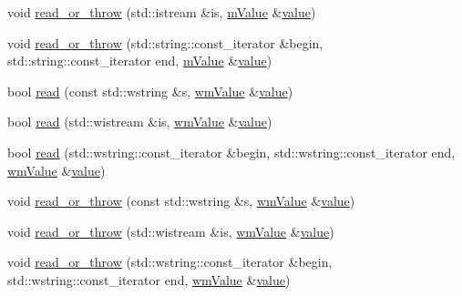 \begin{DoxyCompactItemize}
\item 
void \hyperlink{namespacejson__spirit_ab89d300348df2281cd5f021f19cd02a0}{read\+\_\+or\+\_\+throw} (std\+::istream \&is, \hyperlink{namespacejson__spirit_a4dfd55710919c7c5e20fcbe4e4fe7b46}{m\+Value} \&\hyperlink{cache_8cc_a0f61d63b009d0880a89c843bd50d8d76}{value})
\item 
void \hyperlink{namespacejson__spirit_a965fb92985785a8c65837a106f914834}{read\+\_\+or\+\_\+throw} (std\+::string\+::const\+\_\+iterator \&begin, std\+::string\+::const\+\_\+iterator end, \hyperlink{namespacejson__spirit_a4dfd55710919c7c5e20fcbe4e4fe7b46}{m\+Value} \&\hyperlink{cache_8cc_a0f61d63b009d0880a89c843bd50d8d76}{value})
\item 
bool \hyperlink{namespacejson__spirit_a40037a316f72030c69378d353352b74a}{read} (const std\+::wstring \&s, \hyperlink{namespacejson__spirit_a2b6befe411be23e2a1a9ca590ef212b5}{wm\+Value} \&\hyperlink{cache_8cc_a0f61d63b009d0880a89c843bd50d8d76}{value})
\item 
bool \hyperlink{namespacejson__spirit_a7539d141deb6f3e3e1146d862cd345bb}{read} (std\+::wistream \&is, \hyperlink{namespacejson__spirit_a2b6befe411be23e2a1a9ca590ef212b5}{wm\+Value} \&\hyperlink{cache_8cc_a0f61d63b009d0880a89c843bd50d8d76}{value})
\item 
bool \hyperlink{namespacejson__spirit_aab9b4ea73ae430b93c108beee0731f14}{read} (std\+::wstring\+::const\+\_\+iterator \&begin, std\+::wstring\+::const\+\_\+iterator end, \hyperlink{namespacejson__spirit_a2b6befe411be23e2a1a9ca590ef212b5}{wm\+Value} \&\hyperlink{cache_8cc_a0f61d63b009d0880a89c843bd50d8d76}{value})
\item 
void \hyperlink{namespacejson__spirit_a2664a86bf770543bf65dd02ae38b5af0}{read\+\_\+or\+\_\+throw} (const std\+::wstring \&s, \hyperlink{namespacejson__spirit_a2b6befe411be23e2a1a9ca590ef212b5}{wm\+Value} \&\hyperlink{cache_8cc_a0f61d63b009d0880a89c843bd50d8d76}{value})
\item 
void \hyperlink{namespacejson__spirit_afd54d0a469fdbc0fae6ce0ed69db00fc}{read\+\_\+or\+\_\+throw} (std\+::wistream \&is, \hyperlink{namespacejson__spirit_a2b6befe411be23e2a1a9ca590ef212b5}{wm\+Value} \&\hyperlink{cache_8cc_a0f61d63b009d0880a89c843bd50d8d76}{value})
\item 
void \hyperlink{namespacejson__spirit_a33ed25ccb0affbd12914186dccda6c49}{read\+\_\+or\+\_\+throw} (std\+::wstring\+::const\+\_\+iterator \&begin, std\+::wstring\+::const\+\_\+iterator end, \hyperlink{namespacejson__spirit_a2b6befe411be23e2a1a9ca590ef212b5}{wm\+Value} \&\hyperlink{cache_8cc_a0f61d63b009d0880a89c843bd50d8d76}{value})

\end{DoxyCompactItemize}

